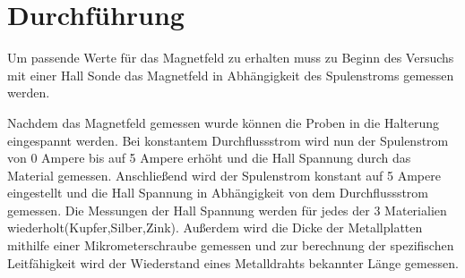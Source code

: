 \newpage
\section{Durchführung}
\label{sec:Durchfuehrung}
Um passende Werte für das Magnetfeld zu erhalten muss zu Beginn des Versuchs
 mit einer Hall Sonde das Magnetfeld in Abhängigkeit des Spulenstroms gemessen werden.

Nachdem das Magnetfeld gemessen wurde können die Proben in die Halterung eingespannt werden.
Bei konstantem Durchflussstrom wird nun der Spulenstrom von 0 Ampere bis auf 5 Ampere erhöht und die Hall Spannung durch das Material gemessen.
Anschließend wird der Spulenstrom konstant auf 5 Ampere eingestellt und die Hall Spannung in Abhängigkeit von dem Durchflussstrom gemessen.
Die Messungen der Hall Spannung werden für jedes der 3 Materialien wiederholt(Kupfer,Silber,Zink).
Außerdem wird die Dicke der Metallplatten mithilfe einer Mikrometerschraube gemessen und zur berechnung der spezifischen Leitfähigkeit wird der Wiederstand eines Metalldrahts bekannter Länge gemessen.